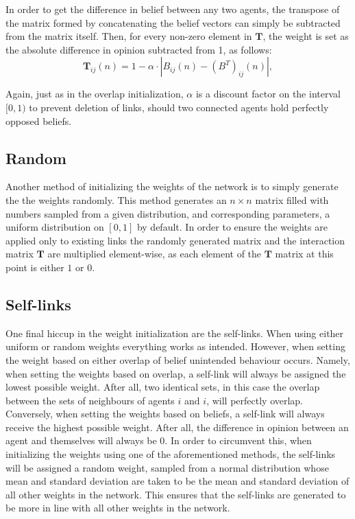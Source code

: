 \documentclass{article}
\newcommand{\T}{\textbf{T}}
\begin{document}
In order to get the difference in belief between any two agents, the transpose of the matrix formed by concatenating the belief vectors can simply be subtracted from the matrix itself. Then, for every non-zero element in $\T$, the weight is set as the absolute difference in opinion subtracted from 1, as follows:
\begin{equation*}
    \T_{ij}(n) = 1 - \alpha \cdot |B_{ij}(n) - (B^{T})_{ij}(n)|,
\end{equation*}

Again, just as in the overlap initialization, $\alpha$ is a discount factor on the interval $[0, 1)$ to prevent deletion of links, should two connected agents hold perfectly opposed beliefs.

\subsection{Random}

Another method of initializing the weights of the network is to simply generate the the weights randomly. This method generates an $n \times n$ matrix filled with numbers sampled from a given distribution, and corresponding parameters, a uniform distribution on $[0, 1]$ by default. In order to ensure the weights are applied only to existing links the randomly generated matrix and the interaction matrix $\T$ are multiplied element-wise, as each element of the $\T$ matrix at this point is either $1$ or $0$.

\subsection{Self-links}

One final hiccup in the weight initialization are the self-links. When using either uniform or random weights everything works as intended. However, when setting the weight based on either overlap of belief unintended behaviour occurs. Namely, when setting the weights based on overlap, a self-link will always be assigned the lowest possible weight. After all, two identical sets, in this case the overlap between the sets of neighbours of agents $i$ and $i$, will perfectly overlap.
Conversely, when setting the weights based on beliefs, a self-link will always receive the highest possible weight. After all, the difference in opinion between an agent and themselves will always be $0$. \newline
In order to circumvent this, when initializing the weights using one of the aforementioned methods, the self-links will be assigned a random weight, sampled from a normal distribution whose mean and standard deviation are taken to be the mean and standard deviation of all other weights in the network. This ensures that the self-links are generated to be more in line with all other weights in the network.
\end{document}
